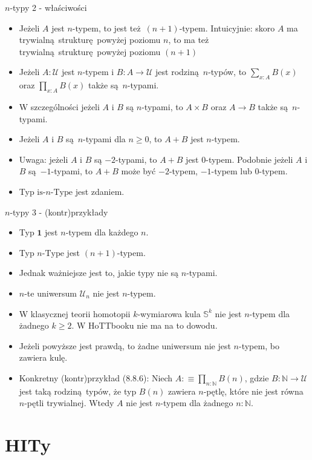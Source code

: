 \documentclass{beamer}
\newcommand{\defn}{:\equiv}
\newcommand{\U}{\mathcal{U}}
\begin{document}
\begin{frame}{$n$-typy 2 - właściwości}
\begin{itemize}
	\item Jeżeli $A$ jest $n$-typem, to jest też $(n + 1)$-typem. Intuicyjnie: skoro $A$ ma trywialną strukturę powyżej poziomu $n$, to ma też trywialną strukturę powyżej poziomu $(n + 1)$
	\item Jeżeli $A : \U$ jest $n$-typem i $B : A \to \U$ jest rodziną $n$-typów, to $\sum_{x : A} B(x)$ oraz $\prod_{x : A} B(x)$ także są $n$-typami.
	\item W szczególności jeżeli $A$ i $B$ są $n$-typami, to $A \times B$ oraz $A \to B$ także są $n$-typami.
	\item Jeżeli $A$ i $B$ są $n$-typami dla $n \geq 0$, to $A + B$ jest $n$-typem.
	\item Uwaga: jeżeli $A$ i $B$ są $-2$-typami, to $A + B$ jest $0$-typem. Podobnie jeżeli $A$ i $B$ są $-1$-typami, to $A + B$ może być $-2$-typem, $-1$-typem lub $0$-typem.
	\item Typ $\text{is-}n\text{-Type}$ jest zdaniem.
\end{itemize}
\end{frame}

\begin{frame}{$n$-typy 3 - (kontr)przykłady}
\begin{itemize}
	\item Typ $\mathbf{1}$ jest $n$-typem dla każdego $n$.
	\item Typ $n\text{-Type}$ jest $(n + 1)$-typem.
	\item Jednak ważniejsze jest to, jakie typy nie są $n$-typami.
	\item $n$-te uniwersum $\U_n$ nie jest $n$-typem.
	\item W klasycznej teorii homotopii $k$-wymiarowa kula $\mathbb{S}^k$ nie jest $n$-typem dla żadnego $k \geq 2$. W HoTTbooku nie ma na to dowodu.
	\item Jeżeli powyższe jest prawdą, to żadne uniwersum nie jest $n$-typem, bo zawiera kulę.
	\item Konkretny (kontr)przykład (8.8.6): Niech $A \defn \prod_{n : \mathbb{N}} B(n)$, gdzie $B : \mathbb{N} \to \U$ jest taką rodziną typów, że typ $B(n)$ zawiera $n$-pętlę, które nie jest równa $n$-pętli trywialnej. Wtedy $A$ nie jest $n$-typem dla żadnego $n : \mathbb{N}$.
\end{itemize}
\end{frame}

\section{HITy}
\end{document}
